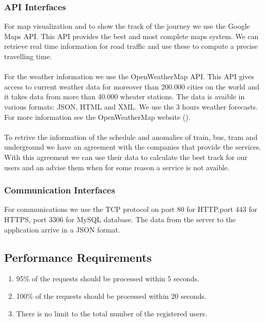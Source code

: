 \subsubsection{API Interfaces}
For map visualization and to show the track of the journey we use the Google Maps API. This API provides the best and most complete maps system. We can retrieve real time information for road traffic and use these to compute a precise travelling time.\\\\
For the weather information we use the OpenWeatherMap API. This API gives access to current weather data for moreover than 200.000 cities on the world and it takes data from more than 40.000 wheater stations. The data is avaible in various formats: JSON, HTML and XML. We use the 3 hours weather forecasts. For more information see the OpenWeatherMap website ({\href{http://openweathermap.org/api}{\color{Black}{http://openweathermap.org/api}}}).
\\\\
To retrive the information of the schedule and anomalies of train, bus, tram and underground we have an agreement with the companies that provide the services. With this agreement we can use their data to calculate the best track for our users and an advise them when for some reason a service is not avaible.

\subsubsection{Communication Interfaces}
For communications we use the TCP protocol on port 80 for HTTP,port 443 for HTTPS, port 3306 for MySQL database. The data from the server to the application arrive in a JSON format.




\clearpage
\subsection{Performance Requirements}
\begin{enumerate}
\item
95\% of the requests should be processed within 5 seconds.
\item
100\% of the requests should be processed within 20 seconds.
\item
There is no limit to the total number of the registered users.
\end{enumerate}

